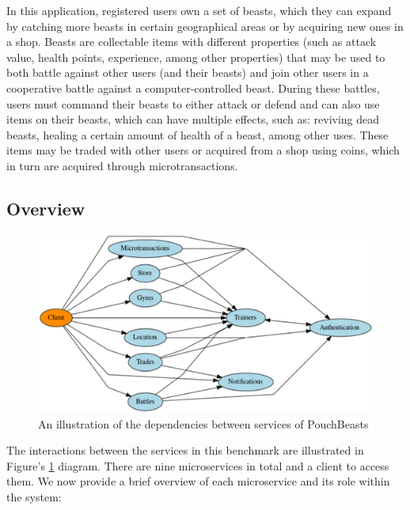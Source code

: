 In this application, registered users own a set of beasts, which they can expand by catching more beasts in certain geographical areas or by acquiring new ones in a shop. Beasts are collectable items with different properties (such as attack value, health points, experience, among other properties) that may be used to both battle against other users (and their beasts) and join other users in a cooperative battle against a computer-controlled beast. During these battles, users must command their beasts to either attack or defend and can also use items on their beasts, which can have multiple effects, such as: reviving dead beasts, healing a certain amount of health of a beast, among other uses. These items may be traded with other users or acquired from a shop using coins, which in turn are acquired through microtransactions.

\subsection{Overview}

\begin{figure}[htbp]
    \centering
    \includegraphics[width=\textwidth]{Chapters/benchmark/figures/interaction-diagram.pdf}
    \caption{An illustration of the dependencies between services of PouchBeasts}
    \label{fig:pouchbeasts-overview}
\end{figure}

The interactions between the services in this benchmark are illustrated in Figure's \ref{fig:pouchbeasts-overview} diagram. There are nine microservices in total and a client to access them. We now provide a brief overview of each microservice and its role within the system:

